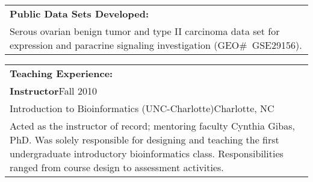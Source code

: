 \documentclass[12pt]{report}
\def\fullLength{6.5in}
\begin{document}
\vspace{-1.0mm}

\begin{table}[!h]
\begin{tabular}{p{\fullLength}}
\textbf{\Large Public Data Sets Developed:}\\
Serous ovarian benign tumor and type II carcinoma data set for expression and paracrine signaling investigation (GEO\#~GSE29156).
\end{tabular}
\end{table}


\begin{table}[!h]
\begin{tabular}{p{\fullLength}}
\textbf{\Large Teaching Experience:}\\
\textbf{Instructor}\hfill Fall 2010\\
Introduction to Bioinformatics (UNC-Charlotte)\hfill Charlotte, NC\\
Acted as the instructor of record; mentoring faculty Cynthia Gibas, PhD. Was solely responsible for designing and teaching the first undergraduate introductory bioinformatics class. Responsibilities ranged from course design to assessment activities.
\end{tabular}
\end{table}
\end{document}
